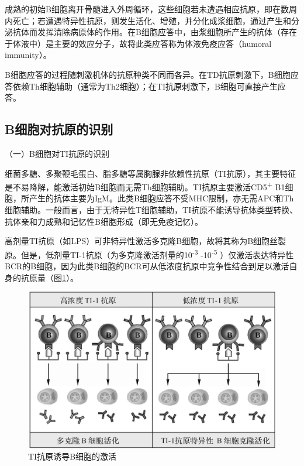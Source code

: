 成熟的初始B细胞离开骨髓进入外周循环，这些细胞若未遭遇相应抗原，即在数周内死亡；若遭遇特异性抗原，则发生活化、增殖，并分化成浆细胞，通过产生和分泌抗体而发挥清除病原体的作用。在B细胞应答中，由浆细胞所产生的抗体（存在于体液中）是主要的效应分子，故将此类应答称为体液免疫应答（humoral
immunity）。

B细胞应答的过程随刺激机体的抗原种类不同而各异。在TD抗原刺激下，B细胞应答依赖Th细胞辅助（通常为Th2细胞）；在TI抗原刺激下，B细胞可直接产生应答。


\subsection{B细胞对抗原的识别}

（一）B细胞对TI抗原的识别

细菌多糖、多聚鞭毛蛋白、脂多糖等属胸腺非依赖性抗原（TI抗原），其主要特征是不易降解，能激活初始B细胞而无需Th细胞辅助。TI抗原主要激活CD5\textsuperscript{+}
B1细胞，所产生的抗体主要为IgM。此类B细胞应答不受MHC限制，亦无需APC和Th细胞辅助。一般而言，由于无特异性T细胞辅助，TI抗原不能诱导抗体类型转换、抗体亲和力成熟和记忆性B细胞形成（即无免疫记忆）。

高剂量TI抗原（如LPS）可非特异性激活多克隆B细胞，故将其称为B细胞丝裂原。但是，低剂量TI-1抗原（为多克隆激活剂量的10\textsuperscript{-3}
-10\textsuperscript{-5}
）仅激活表达特异性BCR的B细胞，因为此类B细胞的BCR可从低浓度抗原中竞争性结合到足以激活自身的抗原量（图\ref{fig9-15}）。

\begin{figure}[!htbp]
 \centering
 \includegraphics{./images/Image00141.jpg}
 \captionsetup{justification=centering}
 \caption{TI抗原诱导B细胞的激活}
 \label{fig9-15}
  \end{figure} 

